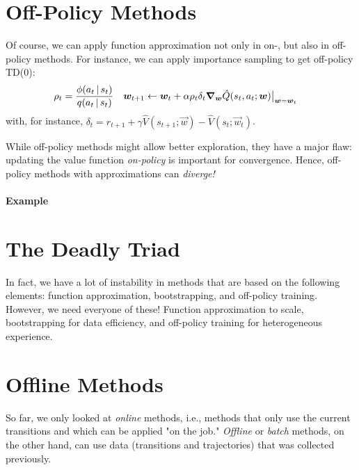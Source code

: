 	\section{Off-Policy Methods}
		Of course, we can apply function approximation not only in on-, but also in off-policy methods. For instance, we can apply importance sampling to get off-policy \acs{TD}(\(0\)):
		\begin{align}
			\rho_t          & = \frac{\phi(a_t \,\vert\, s_t)}{q(a_t \,\vert\, s_t)}                                                                      &
			\bm{w}_{t + 1} & \gets \bm{w}_t + \alpha \rho_t \delta_t \grad_{\bm{w}} \hat{Q}(s_t, a_t; \bm{w}) \bigr\rvert_{\bm{w} = \bm{w}_t}
		\end{align}
		with, for instance, \( \delta_t = r_{t + 1} + \gamma \hat{V}(s_{t + 1}; \vec{w}) - \hat{V}(s_t; \vec{w}_t) \).

		While off-policy methods might allow better exploration, they have a major flaw: updating the value function \emph{on-policy} is important for convergence. Hence, off-policy methods with approximations can \emph{diverge!}

		\paragraph{Example}

	\section{The Deadly Triad}
		\label{sec:deadlyTriad}

		In fact, we have a lot of instability in methods that are based on the following elements: function approximation, bootstrapping, and off-policy training. However, we need everyone of these! Function approximation to scale, bootstrapping for data efficiency, and off-policy training for heterogeneous experience.

	\section{Offline Methods}
		So far, we only looked at \emph{online} methods, i.e., methods that only use the current transitions and which can be applied "on the job." \emph{Offline} or \emph{batch} methods, on the other hand, can use data (transitions and trajectories) that was collected previously.

